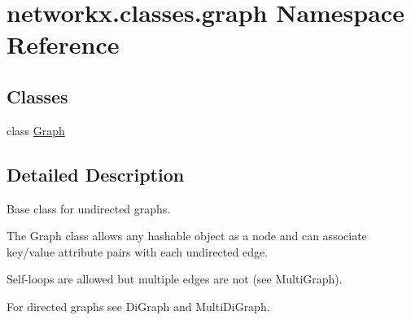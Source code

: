 \hypertarget{namespacenetworkx_1_1classes_1_1graph}{}\section{networkx.\+classes.\+graph Namespace Reference}
\label{namespacenetworkx_1_1classes_1_1graph}
\subsection*{Classes}
\begin{DoxyCompactItemize}
\item 
class \hyperlink{classnetworkx_1_1classes_1_1graph_1_1Graph}{Graph}
\end{DoxyCompactItemize}


\subsection{Detailed Description}
\begin{DoxyVerb}Base class for undirected graphs.

The Graph class allows any hashable object as a node
and can associate key/value attribute pairs with each undirected edge.

Self-loops are allowed but multiple edges are not (see MultiGraph).

For directed graphs see DiGraph and MultiDiGraph.
\end{DoxyVerb}
 
